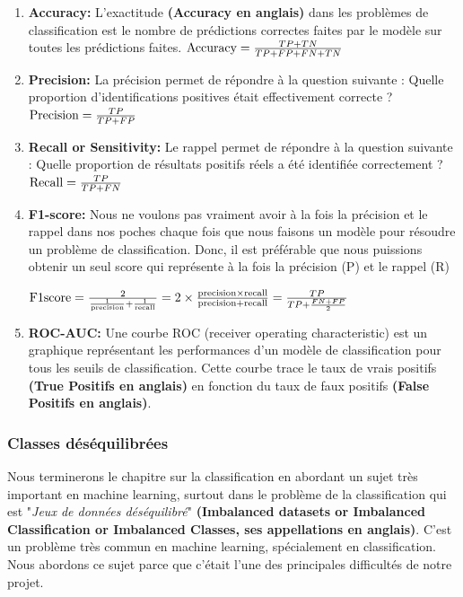 \documentclass[12pt, french]{article}
\begin{document}
\begin{enumerate}
\item \textbf{Accuracy:}
L'exactitude \textbf{(Accuracy en anglais)} dans les problèmes de classification est le nombre de prédictions correctes faites par le modèle sur toutes les prédictions faites.
$\textnormal{Accuracy} = \frac{TP+TN}{TP+ FP + FN + TN} $

\item  \textbf{Precision:} 
La précision permet de répondre à la question suivante : Quelle proportion d'identifications positives était effectivement correcte ?
$\textnormal{Precision} = \frac{TP}{TP+ FP} $

\item \textbf{Recall or Sensitivity:}
Le rappel permet de répondre à la question suivante : Quelle proportion de résultats positifs réels a été identifiée correctement ?
$\textnormal{Recall} = \frac{TP}{TP+ FN} $
 
 \item \textbf{F1-score:}
 Nous ne voulons pas vraiment avoir à la fois la précision et le rappel dans nos poches chaque fois que nous faisons un modèle pour résoudre un problème de classification. Donc, il est préférable que nous puissions obtenir un seul score qui représente à la fois la précision (P) et le rappel (R)
 
 $ \textnormal{F1score} = \frac{ 2 }{\frac {1}{\textnormal{precision}} +  \frac {1}{\textnormal{recall}}  } = 2 \times \frac{\textnormal{precision} \times \textnormal{recall}} { \textnormal{precision} + \textnormal{recall} } = \frac{TP} {TP + \frac{FN+FP} {2} } $
 
 \item \textbf{ROC-AUC:}
Une courbe ROC (receiver operating characteristic) est un graphique représentant les performances d'un modèle de classification pour tous les seuils de classification. Cette courbe trace le taux de vrais positifs \textbf{(True Positifs en anglais)} en fonction du taux de faux positifs \textbf{(False Positifs en anglais)}.
\end{enumerate}

\subsubsection{Classes déséquilibrées}

Nous terminerons le chapitre sur la classification en abordant un sujet très important en machine learning, surtout dans le problème de la classification qui est "\textit{Jeux de données déséquilibré}" \textbf{(Imbalanced datasets or Imbalanced Classification or Imbalanced Classes, ses appellations en anglais)}. C'est un problème très commun en machine learning, spécialement en classification. Nous abordons ce sujet parce que c'était l'une des principales difficultés de notre projet. \\
\end{document}
